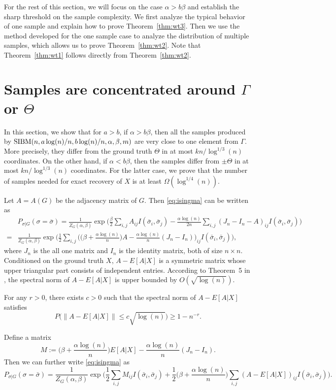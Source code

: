\documentclass{article}
\begin{document}
For the rest of this section, we will focus on the case $\alpha>b\beta$ and establish the sharp threshold on the sample complexity. We first analyze the typical behavior of one sample and explain how to prove Theorem~\ref{thm:wt3}. Then we use the method developed for the one sample case to analyze the distribution of multiple samples, which allows us to prove Theorem~\ref{thm:wt2}. Note that Theorem~\ref{thm:wt1} follows directly from Theorem~\ref{thm:wt2}.

\section{Samples are concentrated around $\Gamma$ or $\Theta$} \label{sect:aln}
In this section, we show that for $a>b$, if $\alpha>b\beta$, then all the samples produced by $\SIBM(n, \linebreak[4]
a\log(n)/n, b\log(n)/n,\alpha,\beta,m)$ are very close to one element from $\Gamma$. More precisely, they differ from the ground truth $\Theta$ in at most $kn/\log^{1/3}(n)$ coordinates.
On the other hand, if $\alpha<b\beta$, then the samples differ from  $\pm \Theta$ in at most $kn/\log^{1/3}(n)$ coordinates.
For the latter case, we prove that the number of samples needed for exact recovery of $X$ is at least $\Omega(\log^{1/4}(n))$.

Let $A=A(G)$ be the adjacency matrix of $G$. Then \eqref{eq:isingma} can be written as
\begin{align*}
& P_{\sigma|G}(\sigma=\bar{\sigma})=\frac{1}{Z_G(\alpha,\beta)}
\exp\Big(\frac{\beta}{2} \sum_{i,j} A_{ij} I(\bar{\sigma}_i,\bar{\sigma}_j)
-\frac{\alpha\log(n)}{2n} \sum_{i,j} (J_n-I_n-A)_{ij} I(\bar{\sigma}_i, \bar{\sigma}_j)
\Big)  \\
= & \frac{1}{Z_G(\alpha,\beta)}
\exp\Big( \frac{1}{2} \sum_{i,j} \Big( \big(\beta+\frac{\alpha\log(n)}{n} \big) A
-\frac{\alpha\log(n)}{n} (J_n-I_n) \Big)_{ij} I(\bar{\sigma}_i,\bar{\sigma}_j)
\Big),
\end{align*}
where $J_n$ is the all one matrix and $I_n$ is the identity matrix, both of size $n\times n$.
Conditioned on the ground truth $X$,
$A-E[A|X]$ is a symmetric matrix whose upper triangular part consists of independent entries. According to Theorem~5 in \cite{Hajek16}, the spectral norm of $A-E[A|X]$ is upper bounded by $O(\sqrt{\log(n)})$.
\begin{theorem} \label{thm:a2}
For any $r>0$, there exists $c>0$ such that the spectral norm of $A-E[A|X]$ satisfies
$$
P\big(\|A-E[A|X]\| \le c\sqrt{\log(n)} \big)\ge 1-n^{-r} .
$$
\end{theorem}
Define a matrix
$$
M:= \big(\beta+\frac{\alpha\log(n)}{n} \big) E[A|X]
-\frac{\alpha\log(n)}{n} (J_n-I_n).
$$
Then we can further write \eqref{eq:isingma}
as
\begin{equation} \label{eq:M}
P_{\sigma|G}(\sigma=\bar{\sigma})
= \frac{1}{Z_G(\alpha,\beta)}
\exp\Big( \frac{1}{2} \sum_{i,j}M_{ij} I(\bar{\sigma}_i, \bar{\sigma}_j) + \frac{1}{2}\big(\beta+\frac{\alpha\log(n)}{n} \big)  \sum_{i,j}  (A-E[A|X])_{ij}
 I(\bar{\sigma}_i, \bar{\sigma}_j)  
\Big)  .
\end{equation}
\end{document}

